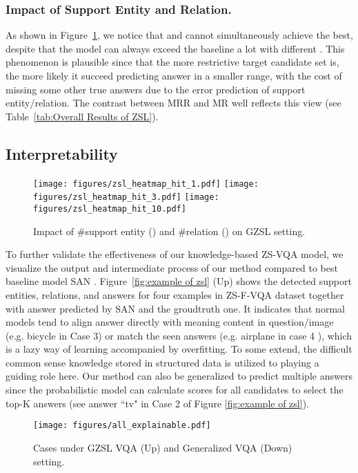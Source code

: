 \documentclass[runningheads]{llncs}
\begin{document}
\subsubsection{Impact of Support Entity and Relation.}\label{sec:Impact of fr}
As shown in Figure~\ref{fig:heatmap of k}, we notice that  and  cannot simultaneously achieve the best, despite that the model can always  exceed the baseline a lot with different . This phenomenon is plausible since that the more restrictive target candidate set is, the more likely it succeed predicting answer in a smaller range, with the cost of missing some other true answers due to the error prediction of support entity/relation. The contrast between MRR and MR well reflects this view (see Table~\ref{tab:Overall Results of ZSL}).
\subsection{Interpretability}\label{sec:Interpretability}
\begin{figure}[htbp]
\centering
\texttt{[image: figures/zsl\_heatmap\_hit\_1.pdf]} 
\texttt{[image: figures/zsl\_heatmap\_hit\_3.pdf]}
\texttt{[image: figures/zsl\_heatmap\_hit\_10.pdf]}
\caption{Impact of \#support entity () and \#relation () on GZSL setting.}
\label{fig:heatmap of k}
\end{figure}
To further validate the effectiveness of our knowledge-based ZS-VQA model, we visualize the output and intermediate process of our method compared to best baseline model SAN \cite{DBLP:conf/cvpr/HuCS18}.
Figure~\ref{fig:example of zsl} (Up) shows the detected support entities, relations, and answers for four examples in ZS-F-VQA dataset together with answer predicted by SAN and the groudtruth one. 
It indicates that normal models tend to align answer directly with meaning content in question/image (e.g. bicycle in Case 3) or match the seen answers (e.g. airplane in case 4 ), which is a lazy way of learning accompanied by overfitting.  
To some extend, the difficult common sense knowledge stored in structured data is utilized to playing a guiding role here.
Our method can also be generalized to predict multiple answers since the probabilistic model can calculate scores for all candidates to select the top-K answers (see answer ``tv" in Case 2 of Figure \ref{fig:example of zsl}).
\begin{figure}[htbp]
\centering
\texttt{[image: figures/all\_explainable.pdf]} 
\caption{Cases under GZSL VQA (Up) and Generalized VQA (Down) setting. }
\label{fig:example of zsl}
\label{fig:example of general}
\end{figure}
\end{document}
